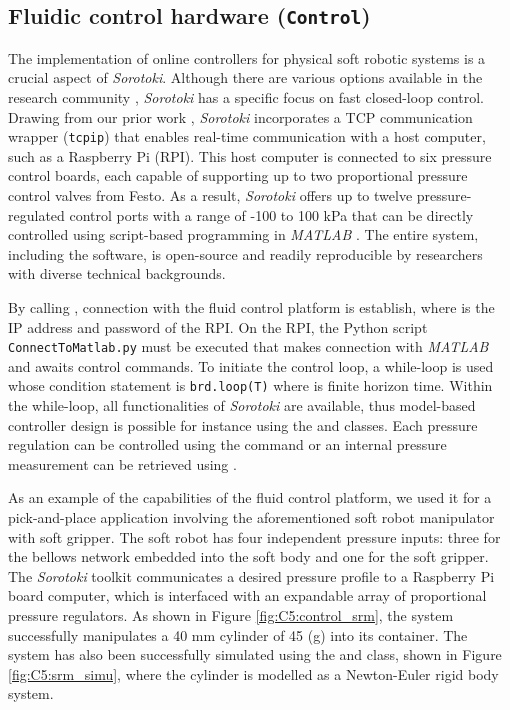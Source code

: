 
\subsection{Fluidic control hardware (\texttt{Control})}
\label{sec:C5:control}
The implementation of online controllers for physical soft robotic systems is a crucial aspect of \textit{Sorotoki}. Although there are various options available in the research community \cite{Xavier2022Jun}, \textit{Sorotoki} has a specific focus on fast closed-loop control. Drawing from our prior work \cite{Caasenbrood2022Apr}, \textit{Sorotoki} incorporates a TCP communication wrapper (\texttt{tcpip}) that enables real-time communication with a host computer, such as a Raspberry Pi (RPI). This host computer is connected to six pressure control boards, each capable of supporting up to two proportional pressure control valves from Festo. As a result, \textit{Sorotoki} offers up to twelve pressure-regulated control ports with a range of -100 to 100 kPa that can be directly controlled using script-based programming in \textit{MATLAB} . The entire system, including the software, is open-source and readily reproducible by researchers with diverse technical backgrounds.

By calling , connection with the fluid control platform is establish, where  is the IP address and password of the RPI. On the RPI, the Python script \texttt{ConnectToMatlab.py} must be executed that makes connection with \textit{MATLAB} and awaits control commands. To initiate the control loop, a while-loop is used whose condition statement is \texttt{brd.loop(T)} where  is finite horizon time. Within the while-loop, all functionalities of \textit{Sorotoki} are available, thus model-based controller design is possible for instance using the  and  classes. Each pressure regulation can be controlled using the command  or an internal pressure measurement can be retrieved using . \\ \vspace{-5mm}

\begin{example}
As an example of the capabilities of the fluid control platform, we used it for a pick-and-place application involving the aforementioned soft robot manipulator with soft gripper. The soft robot has four independent pressure inputs: three for the bellows network embedded into the soft body and one for the soft gripper. The \textit{Sorotoki} toolkit communicates a desired pressure profile to a Raspberry Pi board computer, which is interfaced with an expandable array of proportional pressure regulators. As shown in Figure \ref{fig:C5:control_srm}, the system successfully manipulates a 40 mm cylinder of 45 (g) into its container. The system has also been successfully simulated using the  and  class, shown in Figure \ref{fig:C5:srm_simu}, where the cylinder is modelled as a Newton-Euler rigid body system.
\end{example}

